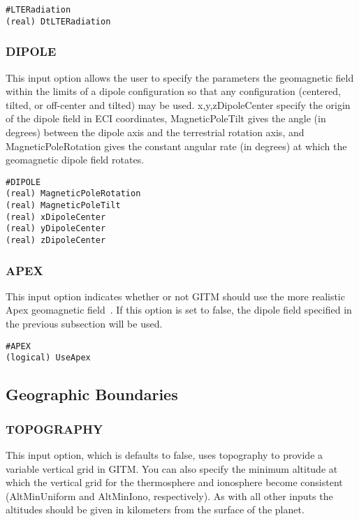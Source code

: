 \begin{verbatim}
#LTERadiation
(real) DtLTERadiation
\end{verbatim}

\subsubsection{DIPOLE}
\label{dipole.sec}

This input option allows the user to specify the parameters the geomagnetic field within the limits of a dipole configuration so that any configuration (centered, tilted, or off-center and tilted) may be used.  x,y,zDipoleCenter specify the origin of the dipole field in ECI coordinates, MagneticPoleTilt gives the angle (in degrees) between the dipole axis and the terrestrial rotation axis, and MagneticPoleRotation gives the constant angular rate (in degrees) at which the geomagnetic dipole field rotates.

\begin{verbatim}
#DIPOLE
(real) MagneticPoleRotation 
(real) MagneticPoleTilt   
(real) xDipoleCenter       
(real) yDipoleCenter       
(real) zDipoleCenter       
\end{verbatim}

\subsubsection{APEX}
\label{apex.sec}

This input option indicates whether or not GITM should use the more realistic Apex geomagnetic field~\citep{richards:1995aa}.  If this option is set to false, the dipole field specified in the previous subsection will be used.

\begin{verbatim}
#APEX
(logical) UseApex
\end{verbatim}


\subsection{Geographic Boundaries}
\label{geograph.sec}

\subsubsection{TOPOGRAPHY}

This input option, which is defaults to false, uses topography to provide a variable vertical grid in GITM.  You can also specify the minimum altitude at which the vertical grid for the thermosphere and ionosphere become consistent (AltMinUniform and AltMinIono, respectively).  As with all other inputs the altitudes should be given in kilometers from the surface of the planet.

